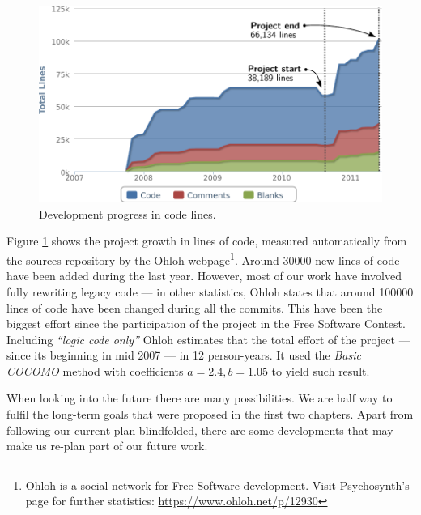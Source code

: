 \begin{figure}[h!]
  \centering
  \includegraphics[width=\textwidth]{pic/dev-progress.pdf}
  \caption{Development progress in code lines.}
  \label{fig:dev-progress}
\end{figure}

Figure \ref{fig:dev-progress} shows the project growth in lines of
code, measured automatically from the sources repository by the Ohloh
webpage\footnote{Ohloh is a social network for Free Software
  development. Visit Psychosynth's page for further statistics:
  \url{https://www.ohloh.net/p/12930}}. Around 30000 new lines of code
have been added during the last year. However, most of our work have
involved fully rewriting legacy code --- in other statistics, Ohloh
states that around 100000 lines of code have been changed during all
the commits. This have been the biggest effort since the participation
of the project in the Free Software Contest. Including \emph{``logic
  code only''} Ohloh estimates that the total effort of the project
--- since its beginning in mid 2007 --- in 12 person-years. It used
the \emph{Basic COCOMO} \cite{bohem00cocomo} method with coefficients
$a = 2.4, b = 1.05$ to yield such result.

When looking into the future there are many possibilities. We are half
way to fulfil the long-term goals that were proposed in the first two
chapters. Apart from following our current plan blindfolded, there are
some developments that may make us re-plan part of our future work.

